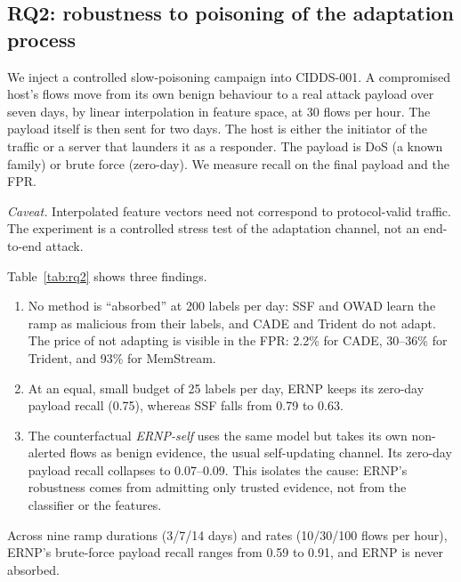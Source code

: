 \documentclass[preprint,12pt]{elsarticle}
\begin{document}
\begin{table}[t]
\centering\small
\caption{Unsampled CIC-IDS2017 (left) and cost on the sampled streams measured one job at a time on a 12-core CPU with an RTX~3050 GPU (right; mean of CIDDS-001, ToN, CSE-CIC-IDS2018). ERNP's refit per period takes 3--55\,s.}\label{tab:scale}
\resizebox{\linewidth}{!}{}
\end{table}

\subsection{RQ2: robustness to poisoning of the adaptation process}\label{sec:rq2}
We inject a controlled slow-poisoning campaign into CIDDS-001. A compromised host's flows move from its own benign behaviour to a real attack payload over seven days, by linear interpolation in feature space, at 30 flows per hour. The payload itself is then sent for two days. The host is either the initiator of the traffic or a server that launders it as a responder. The payload is DoS (a known family) or brute force (zero-day). We measure recall on the final payload and the FPR.

\emph{Caveat.} Interpolated feature vectors need not correspond to protocol-valid traffic. The experiment is a controlled stress test of the adaptation channel, not an end-to-end attack.

Table~\ref{tab:rq2} shows three findings.
\begin{enumerate}
\item No method is ``absorbed'' at 200 labels per day: SSF and OWAD learn the ramp as malicious from their labels, and CADE and Trident do not adapt. The price of not adapting is visible in the FPR: 2.2\% for CADE, 30--36\% for Trident, and 93\% for MemStream.
\item At an equal, small budget of 25 labels per day, ERNP keeps its zero-day payload recall (0.75), whereas SSF falls from 0.79 to 0.63.
\item The counterfactual \emph{ERNP-self} uses the same model but takes its own non-alerted flows as benign evidence, the usual self-updating channel. Its zero-day payload recall collapses to 0.07--0.09. This isolates the cause: ERNP's robustness comes from admitting only trusted evidence, not from the classifier or the features.
\end{enumerate}
Across nine ramp durations (3/7/14 days) and rates (10/30/100 flows per hour), ERNP's brute-force payload recall ranges from 0.59 to 0.91, and ERNP is never absorbed.
\end{document}
